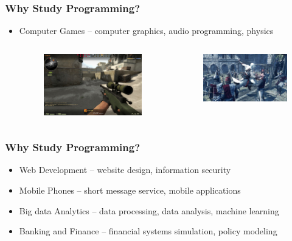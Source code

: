 \documentclass{beamer}
\begin{document}
\begin{frame}
    \frametitle{Why Study Programming?}
    \begin{itemize}
        \item Computer Games -- computer graphics, audio programming, physics
        \begin{columns}
            \begin{figure}
                \centering
                \includegraphics[scale=0.36]{games}
            \end{figure}
            \begin{figure}
                \centering
                \includegraphics[scale=0.31]{games2}
            \end{figure}
        \end{columns}
    \end{itemize}
\end{frame}

\begin{frame}
    \frametitle{Why Study Programming?}
    \begin{itemize}
        \item Web Development -- website design, information security
        \item Mobile Phones -- short message service, mobile applications
        \item Big data Analytics -- data processing, data analysis, machine learning
        \item Banking and Finance -- financial systems simulation, policy modeling
    \end{itemize}
\end{frame}
\end{document}

